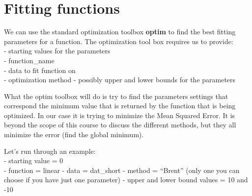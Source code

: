 \documentclass[]{article}
\newenvironment{Shaded}{\begin{snugshade}}{\end{snugshade}}
\newcommand{\KeywordTok}[1]{\textcolor[rgb]{0.13,0.29,0.53}{\textbf{#1}}}
\newcommand{\DecValTok}[1]{\textcolor[rgb]{0.00,0.00,0.81}{#1}}
\newcommand{\StringTok}[1]{\textcolor[rgb]{0.31,0.60,0.02}{#1}}
\newcommand{\ControlFlowTok}[1]{\textcolor[rgb]{0.13,0.29,0.53}{\textbf{#1}}}
\newcommand{\OperatorTok}[1]{\textcolor[rgb]{0.81,0.36,0.00}{\textbf{#1}}}
\newcommand{\NormalTok}[1]{#1}
\begin{document}
\begin{Shaded}
\end{Shaded}

\section{Fitting functions}\label{fitting-functions}

We can use the standard optimization toolbox \textbf{optim} to find the
best fitting parameters for a function. The optimization tool box
requires us to provide:\\
- starting values for the parameters\\
- function\_name\\
- data to fit function on\\
- optimization method - possibly upper and lower bounds for the
parameters

What the optim toolbox will do is try to find the parameters settings
that correspond the minimum value that is returned by the function that
is being optimized. In our case it is trying to minimize the Mean
Squared Error. It is beyond the scope of this course to discuss the
different methods, but they all minimize the error (find the global
minimum).

Let's run through an example:\\
- starting value = 0\\
- function = linear - data = dat\_short - method = ``Brent'' (only one
you can choose if you have just one parameter) - upper and lower bound
values = 10 and -10
\end{document}
